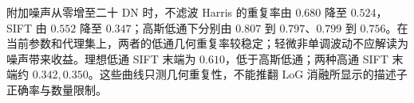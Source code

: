 附加噪声从零增至二十 DN 时，不滤波 Harris 的重复率由 $0.680$ 降至 $0.524$，SIFT 由 $0.552$ 降至 $0.347$；高斯低通下分别由 $0.807$ 到 $0.797$、$0.799$ 到 $0.756$。在当前参数和代理集上，两者的低通几何重复率较稳定；轻微非单调波动不应解读为噪声带来收益。理想低通 SIFT 末端为 $0.610$，低于高斯低通；两种高通 SIFT 末端约 $0.342,0.350$。这些曲线只测几何重复性，不能推翻 LoG 消融所显示的描述子正确率与数量限制。
